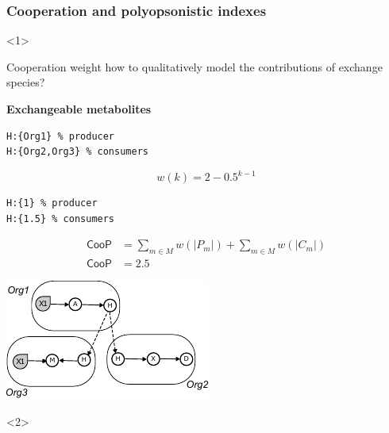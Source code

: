 \documentclass[8pt,usenames,dvipsnames]{beamer}
\begin{document}
\begin{frame}[fragile]
\frametitle{Cooperation and polyopsonistic indexes}

\begin{onlyenv}<1>

\begin{minipage}{0.5\textwidth}
\begin{block}{Cooperation weight}
how to qualitatively model the contributions of exchange species?
\end{block}
\textbf{Exchangeable metabolites}\\
\begin{lstlisting}[mathescape=True]
H:{Org1} % producer
H:{Org2,Org3} % consumers
\end{lstlisting}


\[
w(k) = 2-{0.5^{k-1}}
\]


\begin{lstlisting}[mathescape=True]
H:{1} % producer
H:{1.5} % consumers
\end{lstlisting}
\[
\begin{split}
    \textsf{CooP} &= \sum_{m\in M} w(|P_m|) + \sum_{m\in M} w(|C_m|)\\
     \textsf{CooP} &=  2.5
\end{split}
\]


\end{minipage}%
\hspace{0.5cm}
\hfill
\begin{minipage}{0.4\textwidth}
\includegraphics[width=\textwidth]{figures/exchanged.pdf}
\end{minipage}

\end{onlyenv}
\begin{onlyenv}<2>


\end{onlyenv}
\end{frame}
\end{document}
